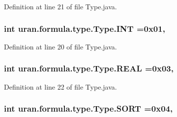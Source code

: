 Definition at line 21 of file Type.\+java.

\hypertarget{classuran_1_1formula_1_1type_1_1_type_a7df72a3f18bfec61795bc30ea645cf16}{}
\subsubsection[{I\+N\+T}]{\setlength{\rightskip}{0pt plus 5cm}int uran.\+formula.\+type.\+Type.\+I\+N\+T =0x01\hspace{0.3cm}{\ttfamily [static]}, {\ttfamily [protected]}}\label{classuran_1_1formula_1_1type_1_1_type_a7df72a3f18bfec61795bc30ea645cf16}


Definition at line 20 of file Type.\+java.

\hypertarget{classuran_1_1formula_1_1type_1_1_type_ac7ad443ffa0eebe8ce0191884c90b739}{}
\subsubsection[{R\+E\+A\+L}]{\setlength{\rightskip}{0pt plus 5cm}int uran.\+formula.\+type.\+Type.\+R\+E\+A\+L =0x03\hspace{0.3cm}{\ttfamily [static]}, {\ttfamily [protected]}}\label{classuran_1_1formula_1_1type_1_1_type_ac7ad443ffa0eebe8ce0191884c90b739}


Definition at line 22 of file Type.\+java.

\hypertarget{classuran_1_1formula_1_1type_1_1_type_a5e12f7d3ee8c14a0f67d3a573622ada6}{}
\subsubsection[{S\+O\+R\+T}]{\setlength{\rightskip}{0pt plus 5cm}int uran.\+formula.\+type.\+Type.\+S\+O\+R\+T =0x04\hspace{0.3cm}{\ttfamily [static]}, {\ttfamily [protected]}}\label{classuran_1_1formula_1_1type_1_1_type_a5e12f7d3ee8c14a0f67d3a573622ada6}



